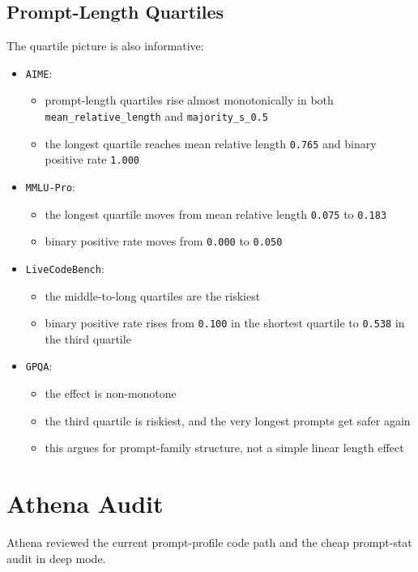 \documentclass[11pt]{article}
\begin{document}
\subsection*{Prompt-Length Quartiles}
The quartile picture is also informative:
\begin{itemize}[leftmargin=1.5em]
\item \texttt{AIME}:
  \begin{itemize}[leftmargin=1.5em]
  \item prompt-length quartiles rise almost monotonically in both \texttt{mean\_relative\_length} and \texttt{majority\_s\_0.5}
  \item the longest quartile reaches mean relative length \texttt{0.765} and binary positive rate \texttt{1.000}
  \end{itemize}
\item \texttt{MMLU-Pro}:
  \begin{itemize}[leftmargin=1.5em]
  \item the longest quartile moves from mean relative length \texttt{0.075} to \texttt{0.183}
  \item binary positive rate moves from \texttt{0.000} to \texttt{0.050}
  \end{itemize}
\item \texttt{LiveCodeBench}:
  \begin{itemize}[leftmargin=1.5em]
  \item the middle-to-long quartiles are the riskiest
  \item binary positive rate rises from \texttt{0.100} in the shortest quartile to \texttt{0.538} in the third quartile
  \end{itemize}
\item \texttt{GPQA}:
  \begin{itemize}[leftmargin=1.5em]
  \item the effect is non-monotone
  \item the third quartile is riskiest, and the very longest prompts get safer again
  \item this argues for prompt-family structure, not a simple linear length effect
  \end{itemize}
\end{itemize}

\section*{Athena Audit}
Athena reviewed the current prompt-profile code path and the cheap prompt-stat audit in deep mode.
\end{document}

